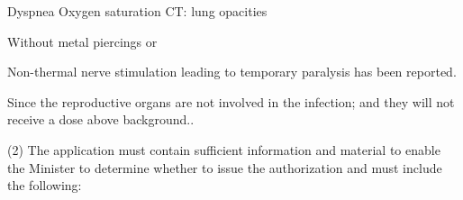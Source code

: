\documentclass[fleqn,10pt]{paper}
\begin{document}
Dyspnea
Oxygen saturation
CT: lung opacities

Without metal piercings or 




Non-thermal nerve stimulation leading to temporary paralysis has been reported. 

Since the reproductive organs are not involved in the infection; and they will not receive a dose above background.\cite{Organ2004}.





\citationneeded



(2) The application must contain sufficient information and material to enable the Minister to determine whether to issue the authorization and must include the following:
\end{document}
